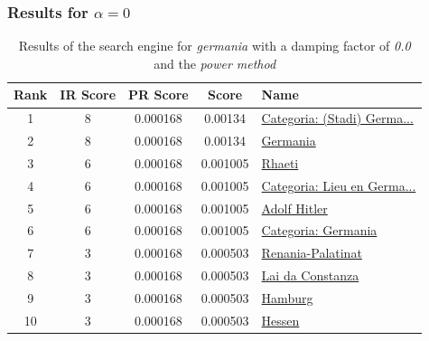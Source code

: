 \documentclass[10pt]{beamer}
\begin{document}
\begin{frame}
  \frametitle{Results for $\alpha = 0$}
  \begin{table}
    \begin{tabular}{ | c | c | c | c | l | }
      \hline
      Rank & IR Score & PR Score &  Score & Name \\ \hline
      1 & 8 & 0.000168 & 0.00134 & \href{http://rm.wikipedia.org/wiki/Categoria:(Stadi)_Germania}{Categoria: (Stadi) Germa...} \\ \hline
      2 & 8 & 0.000168 & 0.00134 & \href{http://rm.wikipedia.org/wiki/Germania}{Germania} \\ \hline
      3 & 6 & 0.000168 & 0.001005 & \href{http://rm.wikipedia.org/wiki/Rhaeti}{Rhaeti} \\ \hline
      4 & 6 & 0.000168 & 0.001005 & \href{http://rm.wikipedia.org/wiki/Categoria:Lieu_en_Germania}{Categoria: Lieu en Germa...} \\ \hline
      5 & 6 & 0.000168 & 0.001005 & \href{http://rm.wikipedia.org/wiki/Adolf_Hitler}{Adolf Hitler} \\ \hline
      6 & 6 & 0.000168 & 0.001005 & \href{http://rm.wikipedia.org/wiki/Categoria:Germania}{Categoria: Germania} \\ \hline
      7 & 3 & 0.000168 & 0.000503 & \href{http://rm.wikipedia.org/wiki/Renania-Palatinat}{Renania-Palatinat} \\ \hline
      8 & 3 & 0.000168 & 0.000503 & \href{http://rm.wikipedia.org/wiki/Lai_da_Constanza}{Lai da Constanza} \\ \hline
      9 & 3 & 0.000168 & 0.000503 & \href{http://rm.wikipedia.org/wiki/Hamburg}{Hamburg} \\ \hline
      10 & 3 & 0.000168 & 0.000503 & \href{http://rm.wikipedia.org/wiki/Hessen}{Hessen} \\ \hline
    \end{tabular}
    \caption{Results of the search engine for \emph{germania} with a damping factor of \emph{0.0} and the \emph{power method}}
    \label{table_d=0.0}
  \end{table}
\end{frame}
\end{document}
